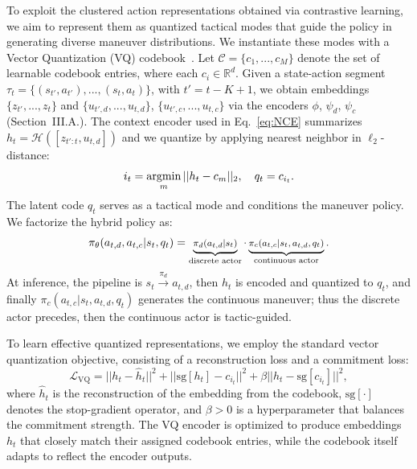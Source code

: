 To exploit the clustered action representations obtained via contrastive learning, we aim to represent them as quantized tactical modes that guide the policy in generating diverse maneuver distributions.
We instantiate these modes with a Vector Quantization (VQ) codebook~\cite{van2017neural}.
Let $\mathcal{C}=\{c_1, ..., c_M\}$ denote the set of learnable codebook entries, where each $c_i \in \mathbb{R}^d$.
Given a state-action segment $\tau_t=\{(s_{t'}, a_{t'}), ..., (s_{t}, a_{t})\}$, with $t'=t-K+1$, we obtain embeddings $\{z_{t'}, ..., z_{t}\}$ and $\{u_{t', d}, ..., u_{t,d}\}$, $\{u_{t', c}, ..., u_{t,c}\}$ via the encoders $\phi$, $\psi_d$, $\psi_c$ (Section~III.A.).
The context encoder used in Eq.~\eqref{eq:NCE} summarizes $h_t=\mathcal{H}([z_{t':t}, u_{t, d}])$ and we quantize by applying nearest neighbor in $\ell_2$-distance:
\begin{equation}
    i_t = \argmin_m ||h_t - c_m||_2, \quad q_t=c_{i_t}.
    \label{eq:indexing}
\end{equation}
The latent code $q_t$ serves as a tactical mode and conditions the maneuver policy.
We factorize the hybrid policy as:
\begin{equation}
    \footnotesize
    \pi_\theta(a_{t,d}, a_{t,c}|s_t, q_t) = \underbrace{\pi_d(a_{t,d}|s_t)}_{\text{discrete actor}}\cdot \underbrace{\pi_c(a_{t,c}|s_t, a_{t,d}, q_t)}_{\text{continuous actor}}.
    \label{eq:hybrid_policy_factorized}
\end{equation}
At inference, the pipeline is $s_t \xrightarrow{\pi_d} a_{t,d}$, then $h_t$ is encoded and quantized to $q_t$, and finally $\pi_c(a_{t,c}|s_t, a_{t,d}, q_t)$ generates the continuous maneuver; thus the discrete actor precedes, then the continuous actor is tactic-guided.

To learn effective quantized representations, we employ the standard vector quantization objective, consisting of a reconstruction loss and a commitment loss:
\begin{equation}
    \mathcal{L}_{\text{VQ}} = ||h_t - \hat{h}_t||^2 +  ||\text{sg}[h_t] - c_{i_t}||^2 + \beta || h_t - \text{sg}[c_{i_t}]||^2,
    \label{eq:VQ}
\end{equation}
where $\hat{h}_t$ is the reconstruction of the embedding from the codebook, $\text{sg}[\cdot]$ denotes the stop-gradient operator, and $\beta > 0$ is a hyperparameter that balances the commitment strength.
The VQ encoder is optimized to produce embeddings $h_t$ that closely match their assigned codebook entries, while the codebook itself adapts to reflect the encoder outputs.